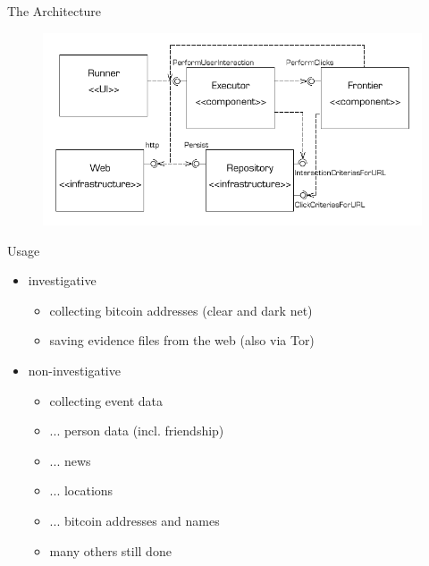 \documentclass{beamer}
\begin{document}
\begin{frame}{The Architecture}

\begin{figure}
\includegraphics[scale=0.3]{crawler-deepweb-componentdiagram.png}
\end{figure}

\end{frame}

\begin{frame}{Usage}

\begin{itemize}
  \item investigative
  \begin{itemize}
    \item collecting bitcoin addresses (clear and dark net)
    \item saving evidence files from the web (also via Tor)
  \end{itemize}

  \item non-investigative
  \begin{itemize}
    \item collecting event data
    \item ... person data (incl. friendship)
    \item ... news
    \item ... locations
    \item ... bitcoin addresses and names
    \item many others still done
  \end{itemize}
\end{itemize}

\end{frame}
\end{document}
